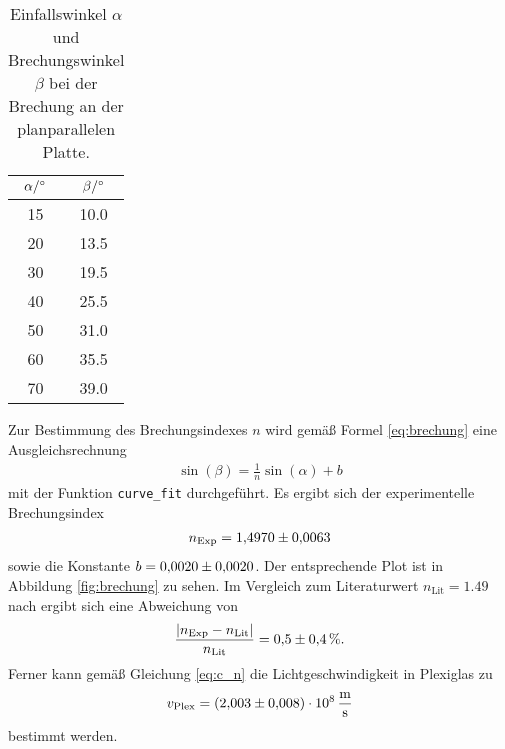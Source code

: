 \begin{table}[H]
    \centering
    \caption[short]{Einfallswinkel $\alpha$ und Brechungswinkel $\beta$ bei der Brechung an der planparallelen Platte.}
    \label{tab:brechung}
    \begin{tabular}{S S[table-format=2.1]}
        \toprule
        {$\alpha / \unit[]{\degree}$} & {$\beta / \unit[]{\degree}$} \\
        \midrule
        15 & 10.0 \\
        20 & 13.5 \\
        30 & 19.5 \\
        40 & 25.5 \\
        50 & 31.0 \\
        60 & 35.5 \\
        70 & 39.0 \\
        \bottomrule
    \end{tabular}
\end{table}


Zur Bestimmung des Brechungsindexes $n$ wird gemäß Formel \eqref{eq:brechung} eine Ausgleichsrechnung
\begin{align}
    \sin(\beta) = \frac{1}{n} \sin(\alpha) + b
\end{align}
mit der Funktion \texttt{curve\_fit} durchgeführt.
Es ergibt sich der experimentelle Brechungsindex
\begin{align}
    n_\text{Exp} = \num[]{1.4970 +- 0.0063}
\end{align}
sowie die Konstante $b = \num[]{0.0020 +- 0.0020}$.
Der entsprechende Plot ist in Abbildung \ref{fig:brechung} zu sehen.
Im Vergleich zum Literaturwert $n_\text{Lit} = \num[]{1.49}$ nach \cite[]{brechungsindex} ergibt sich eine Abweichung von 
\begin{align}
    \frac{|n_\text{Exp} - n_\text{Lit}|}{n_\text{Lit}} = \num[]{0.5 +- 0.4} \, \%.
\end{align}
Ferner kann gemäß Gleichung \eqref{eq:c_n} die Lichtgeschwindigkeit in Plexiglas zu
\begin{align}
    v_\text{Plex} = (\num[]{2.003 +- 0.008}) \cdot 10^8 \, \unit{\meter\per\second}
\end{align}
bestimmt werden.


